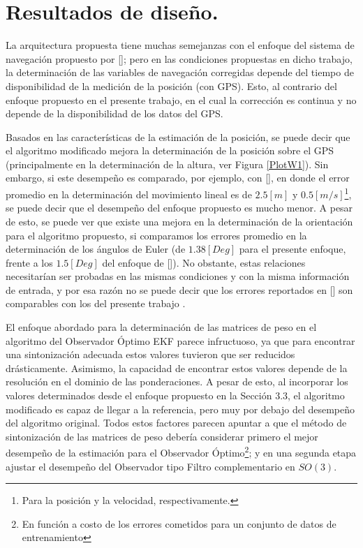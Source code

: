 \documentclass[10pt]{report}
\numberwithin{equation}{chapter}
\numberwithin{algorithm}{chapter}
\newcommand{\bcite}[1]{[\cite{#1}]}
\begin{document}
\section{Resultados de diseño.}
La arquitectura propuesta tiene muchas semejanzas con el enfoque del sistema de navegación propuesto por \bcite{Kong2004}; pero en las condiciones propuestas en dicho trabajo, la determinación de las variables de navegación corregidas depende del tiempo de disponibilidad de la medición de la posición (con GPS). Esto, al contrario del enfoque propuesto en el presente trabajo, en el cual la corrección es continua y no depende de la disponibilidad de los datos del GPS.\par
Basados en las características de la estimación de la posición, se puede decir que el algoritmo modificado mejora la determinación de la posición sobre el GPS (principalmente en la determinación de la altura, ver Figura \ref{PlotW1}). Sin embargo, si este desempeño es comparado, por ejemplo, con \bcite{Cai2011}, en donde el error promedio en la determinación del movimiento lineal es de $2.5 [m]$ y $0.5 [m/s]$\footnote{Para la posición y la velocidad, respectivamente.}, se puede decir que el desempeño del enfoque propuesto es mucho menor. A pesar de esto, se puede ver que existe una mejora en la determinación de la orientación para el algoritmo propuesto, si comparamos los errores promedio en la determinación de los ángulos de Euler (de $1.38[Deg]$ para el presente enfoque, frente a los $1.5[Deg]$ del enfoque de \bcite{Cai2011}). No obstante, estas relaciones necesitarían ser probadas en las mismas condiciones y con la misma información de entrada, y por esa razón no se puede decir que los errores reportados en \bcite{Cai2011} son comparables con los del presente trabajo .\par
El enfoque abordado para la determinación de las matrices de peso en el algoritmo del Observador Óptimo EKF parece infructuoso, ya que para encontrar una sintonización adecuada estos valores tuvieron que ser reducidos drásticamente. Asimismo, la capacidad de encontrar estos valores depende de la resolución en el dominio de las ponderaciones. A pesar de esto, al incorporar los valores determinados desde el enfoque propuesto en la Sección 3.3, el algoritmo modificado es capaz de llegar a la referencia, pero muy por debajo del desempeño del algoritmo original. Todos estos factores parecen apuntar a que el método de sintonización de las matrices de peso debería considerar primero el mejor desempeño de la estimación para el Observador Óptimo\footnote{En función a costo de los errores cometidos para un conjunto de datos de entrenamiento}; y en una segunda etapa ajustar el desempeño del Observador tipo Filtro complementario en $SO(3)$. \par
\end{document}
